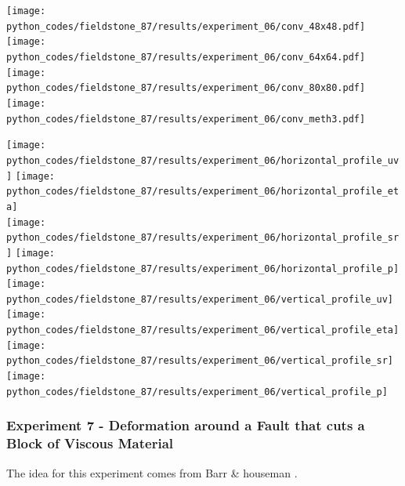 \begin{center}
\texttt{[image: python\_codes/fieldstone\_87/results/experiment\_06/conv\_48x48.pdf]}
\texttt{[image: python\_codes/fieldstone\_87/results/experiment\_06/conv\_64x64.pdf]}\\
\texttt{[image: python\_codes/fieldstone\_87/results/experiment\_06/conv\_80x80.pdf]}
\texttt{[image: python\_codes/fieldstone\_87/results/experiment\_06/conv\_meth3.pdf]}
\end{center}

\begin{center}
\texttt{[image: python\_codes/fieldstone\_87/results/experiment\_06/horizontal\_profile\_uv]}
\texttt{[image: python\_codes/fieldstone\_87/results/experiment\_06/horizontal\_profile\_eta]}\\
\texttt{[image: python\_codes/fieldstone\_87/results/experiment\_06/horizontal\_profile\_sr]}
\texttt{[image: python\_codes/fieldstone\_87/results/experiment\_06/horizontal\_profile\_p]}\\
\texttt{[image: python\_codes/fieldstone\_87/results/experiment\_06/vertical\_profile\_uv]}
\texttt{[image: python\_codes/fieldstone\_87/results/experiment\_06/vertical\_profile\_eta]}\\
\texttt{[image: python\_codes/fieldstone\_87/results/experiment\_06/vertical\_profile\_sr]}
\texttt{[image: python\_codes/fieldstone\_87/results/experiment\_06/vertical\_profile\_p]}\\
\end{center}



\newpage
\subsubsection*{Experiment 7 - Deformation around a Fault that cuts a Block of Viscous Material}

The idea for this experiment comes from Barr \& houseman \cite{baho92,baho96}.


